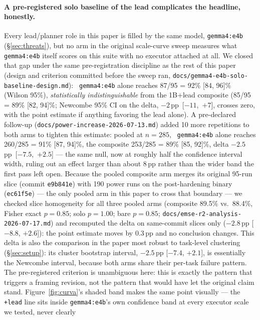 \documentclass[smallcondensed,natbib]{svjour3}
\begin{document}
\paragraph{A pre-registered solo baseline of the lead complicates the
headline, honestly.} Every lead/planner role in this paper is filled by
the same model, \texttt{gemma4:e4b} (\S\ref{sec:threats}), but no arm
in the original scale-curve sweep measures what \texttt{gemma4:e4b}
itself scores on this suite with no executor attached at all. We
closed that gap under the same pre-registration discipline as the
rest of this paper (design and criterion committed before the sweep
ran, \texttt{docs/gemma4-e4b-solo-baseline-design.md}): \texttt{
gemma4:e4b} alone reaches 87/95 = 92\% [84, 96]\% (Wilson 95\%),
\emph{statistically indistinguishable} from the 1B+lead composite
(85/95 = 89\% [82, 94]\%; Newcombe 95\% CI on the delta,
$-2$\,pp~[$-11$,~$+7$], crosses zero, with the point estimate if
anything favoring the lead alone). A pre-declared follow-up
(\texttt{docs/power-increase-2026-07-13.md}) added 10 more repetitions
to both arms to tighten this estimate: pooled at $n{=}285$, \texttt{
gemma4:e4b} alone reaches 260/285 = 91\% [87, 94]\%, the composite
253/285 = 89\% [85, 92]\%, delta $-2.5$\,pp~[$-7.5$,~$+2.5$] --- the
same null, now at roughly half the confidence interval width, ruling
out an effect larger than about 8\,pp rather than the wider band the
first pass left open. Because the pooled composite arm merges its original
95-run slice (commit \texttt{e9b841e}) with 190 power runs on the
post-hardening binary (\texttt{ec61f5e}) --- the only pooled arm in
this paper to cross that boundary --- we checked slice homogeneity for
all three pooled arms (composite 89.5\% vs.\ 88.4\%, Fisher exact
$p{=}0.85$; solo $p{=}1.00$; bare $p{=}0.85$;
\texttt{docs/emse-r2-analysis-2026-07-17.md}) and recomputed the delta
on same-commit slices only ($-2.8$\,pp [$-8.8$, $+2.6$]): the point
estimate moves by 0.3\,pp and no conclusion changes. This delta is
also the comparison in the paper most robust to task-level clustering
(\S\ref{sec:setup}): its cluster bootstrap interval, $-2.5$\,pp
[$-7.4$, $+2.1$], is essentially the Newcombe interval, because both
arms share their per-task failure pattern. The pre-registered criterion is
unambiguous here: this is exactly the pattern that triggers a framing
revision, not the pattern that would have let the original claim
stand. Figure~\ref{fig:curva}'s shaded band makes the same point
visually --- the \texttt{+lead} line sits inside \texttt{gemma4:e4b}'s
own confidence band at every executor scale we tested, never clearly
\end{document}
